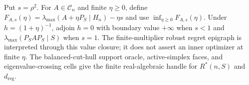 Put \(s=\rho^2\). For \(A\in\mathcal C_n\) and finite \(\eta\geq0\), define \(F_{A,s}(\eta)=\lambda_{\max}(A+\eta P_S\mid H_n)-\eta s\) and use \(\inf_{\eta\geq0}F_{A,s}(\eta)\). Under \(h=(1+\eta)^{-1}\), adjoin \(h=0\) with boundary value \(+\infty\) when \(s<1\) and \(\lambda_{\max}(P_SAP_S\mid S)\) when \(s=1\). The finite-multiplier robust regret epigraph is interpreted through this value closure; it does not assert an inner optimizer at finite \(\eta\). The balanced-cut-hull support oracle, active-simplex faces, and eigenvalue-crossing cells give the finite real-algebraic handle for \(R^*(n,S)\) and \(d_{\mathrm{reg}}\).